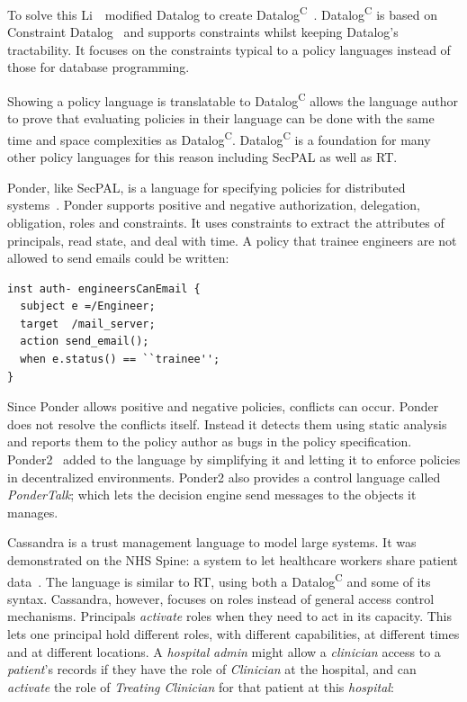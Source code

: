 \documentclass[thesis.tex]{subfiles}
\begin{document}
To solve this Li~\etal{}~modified
Datalog to create Datalog\textsuperscript{C}~\cite{li_datalog_2003}.
Datalog\textsuperscript{C} is
based on Constraint
Datalog~\cite{revesz_constraint_1995,revesz_safe_1998} and
supports constraints whilst keeping Datalog's tractability. It focuses on
the constraints typical to a policy languages instead of those for
database programming.

Showing a policy language is translatable to Datalog\textsuperscript{C} allows the language author 
to prove that evaluating policies in their language can be done with the same time and space complexities as Datalog\textsuperscript{C}.
Datalog\textsuperscript{C} is a foundation for many
other policy languages for this reason including SecPAL as well as RT.  

Ponder, like SecPAL, is a language for specifying policies for distributed
systems~\cite{damianou_ponder_2001}. Ponder supports positive and negative
authorization, delegation, obligation, roles and constraints. It uses constraints to
extract the attributes of principals, read state, and deal with time.
A policy that trainee engineers are not allowed to send emails could be written:

\begin{lstlisting}
inst auth- engineersCanEmail {
  subject e =/Engineer;
  target  /mail_server;
  action send_email();
  when e.status() == ``trainee'';
}
\end{lstlisting}

Since Ponder allows positive and negative policies, conflicts can occur.
Ponder does not resolve the conflicts itself. Instead it detects them using
static analysis and reports them to the policy author as bugs in the policy
specification. Ponder2~\cite{twidle_ponder2:_2009} added to the language by
simplifying it and letting it to enforce policies in decentralized
environments. Ponder2 also provides a control language called \emph{PonderTalk};
which lets the decision engine send messages to the objects it
manages.

Cassandra is a trust management language to model large systems.
It was demonstrated on the NHS Spine: a system to let healthcare
workers share patient
data~\cite{becker_cassandra:_2004,becker_cassandra:_2004-1}.  The
language is similar to RT, using both a Datalog\textsuperscript{C} and some
of its syntax. Cassandra, however, focuses on roles instead of general access
control mechanisms.  Principals \emph{activate} roles when they need to act in its
capacity.  This lets one principal hold different roles, with
different capabilities, at different times and at different
locations.  A \emph{hospital} \emph{admin} might allow a
\emph{clinician} access to a \emph{patient}'s records if they
have the role of \emph{Clinician} at the hospital, and can
\emph{activate} the role of \emph{Treating Clinician} for that patient
at this \emph{hospital}:
\end{document}
